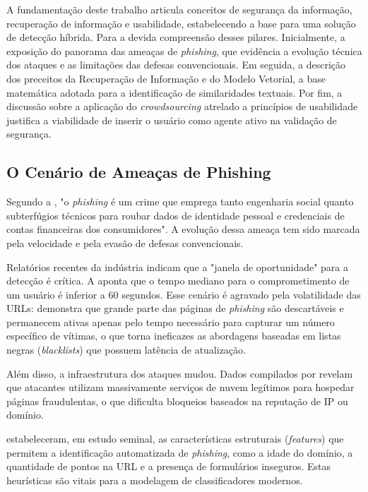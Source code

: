 \documentclass[a4paper,12pt]{article}
\begin{document}
A fundamentação deste trabalho articula conceitos de segurança da informação, recuperação de informação e usabilidade, estabelecendo a base para uma solução de detecção híbrida. Para a devida compreensão desses pilares. Inicialmente, a exposição do panorama das ameaças de \textit{phishing}, que evidência a evolução técnica dos ataques e as limitações das defesas convencionais. Em seguida, a descrição dos preceitos da Recuperação de Informação e do Modelo Vetorial, a base matemática adotada para a identificação de similaridades textuais. Por fim, a discussão sobre a aplicação do \textit{crowdsourcing} atrelado a princípios de usabilidade justifica a viabilidade de inserir o usuário como agente ativo na validação de segurança.

\subsection{O Cenário de Ameaças de Phishing}

Segundo a , "o \textit{phishing} é um crime que emprega tanto engenharia social quanto subterfúgios técnicos para roubar dados de identidade pessoal e credenciais de contas financeiras dos consumidores". A evolução dessa ameaça tem sido marcada pela velocidade e pela evasão de defesas convencionais.

Relatórios recentes da indústria indicam que a "janela de oportunidade" para a detecção é crítica. A  aponta que o tempo mediano para o comprometimento de um usuário é inferior a 60 segundos. Esse cenário é agravado pela volatilidade das URLs:  demonstra que grande parte das páginas de \textit{phishing} são descartáveis e permanecem ativas apenas pelo tempo necessário para capturar um número específico de vítimas, o que torna ineficazes as abordagens baseadas em listas negras (\textit{blacklists}) que possuem latência de atualização.

Além disso, a infraestrutura dos ataques mudou. Dados compilados por  revelam que atacantes utilizam massivamente serviços de nuvem legítimos para hospedar páginas fraudulentas, o que dificulta bloqueios baseados na reputação de IP ou domínio.

 estabeleceram, em estudo seminal, as características estruturais (\textit{features}) que permitem a identificação automatizada de \textit{phishing}, como a idade do domínio, a quantidade de pontos na URL e a presença de formulários inseguros. Estas heurísticas são vitais para a modelagem de classificadores modernos.
\end{document}

